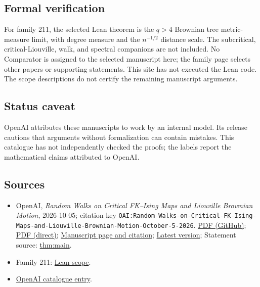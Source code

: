 \documentclass[11pt]{article}
\begin{document}
\subsection{Formal verification}
For family 211, the selected Lean theorem is the $q>4$ Brownian tree metric-measure limit, with degree measure and the $n^{-1/2}$ distance scale. The subcritical, critical-Liouville, walk, and spectral companions are not included. No Comparator is assigned to the selected manuscript here; the family page selects other papers or supporting statements. This site has not executed the Lean code. The scope descriptions do not certify the remaining manuscript arguments.

\subsection{Status caveat}
OpenAI attributes these manuscripts to work by an internal model. Its release cautions that arguments without formalization can contain mistakes. This catalogue has not independently checked the proofs; the labels report the mathematical claims attributed to OpenAI.

\subsection{Sources}
\begin{itemize}
\item OpenAI, \emph{Random Walks on Critical FK–Ising Maps and Liouville Brownian Motion}, 2026-10-05; citation key \texttt{OAI:Random-Walks-on-Critical-FK-Ising-Maps-and-Liouville-Brownian-Motion-October-5-2026}. \href{https://github.com/openai/math/blob/adc7f1241b42e322a6451854ab7e4b4c146bf78a/preprints/Random-Walks-on-Critical-FK-Ising-Maps-and-Liouville-Brownian-Motion-October-5-2026/fk-ising-walk-limit.pdf}{PDF (GitHub)}; \href{https://github.com/openai/math/raw/adc7f1241b42e322a6451854ab7e4b4c146bf78a/preprints/Random-Walks-on-Critical-FK-Ising-Maps-and-Liouville-Brownian-Motion-October-5-2026/fk-ising-walk-limit.pdf}{PDF (direct)}; \href{https://github.com/openai/math/blob/adc7f1241b42e322a6451854ab7e4b4c146bf78a/preprints/Random-Walks-on-Critical-FK-Ising-Maps-and-Liouville-Brownian-Motion-October-5-2026/README.md}{Manuscript page and citation}; \href{https://github.com/openai/math/blob/main/preprints/Random-Walks-on-Critical-FK-Ising-Maps-and-Liouville-Brownian-Motion-October-5-2026/fk-ising-walk-limit.pdf}{Latest version}; Statement source: \href{https://github.com/openai/math/blob/adc7f1241b42e322a6451854ab7e4b4c146bf78a/preprints/Random-Walks-on-Critical-FK-Ising-Maps-and-Liouville-Brownian-Motion-October-5-2026/build/sections/introduction.tex\#L63}{thm:main}.
\item Family 211: \href{https://github.com/openai/math/blob/adc7f1241b42e322a6451854ab7e4b4c146bf78a/lean/docs/211.md}{Lean scope}.
\item \href{https://github.com/openai/math/blob/adc7f1241b42e322a6451854ab7e4b4c146bf78a/CONTENTS.md}{OpenAI catalogue entry}.
\end{itemize}
\end{document}
